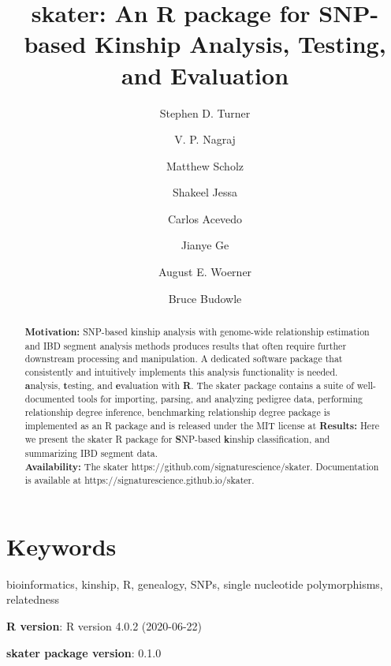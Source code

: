 \documentclass[9pt,a4paper,]{extarticle}
\begin{document}
\pagestyle{front}

\title{\textbf{skater}: An R package for SNP-based Kinship Analysis, Testing, and Evaluation}

\author[1]{Stephen D. Turner}
\author[1]{V. P. Nagraj}
\author[1]{Matthew Scholz}
\author[1]{Shakeel Jessa}
\author[1]{Carlos Acevedo}
\author[2]{Jianye Ge}
\author[2]{August E. Woerner}
\author[2]{Bruce Budowle}

\maketitle
\thispagestyle{front}

\begin{abstract}
\textbf{Motivation:} SNP-based kinship analysis with genome-wide relationship estimation and IBD segment analysis methods produces results that often require further downstream processing and manipulation. A dedicated software package that consistently and intuitively implements this analysis functionality is needed.\\
\textbf{a}nalysis, \textbf{t}esting, and \textbf{e}valuation with \textbf{R}. The skater package contains a suite of well-documented tools for importing, parsing, and analyzing pedigree data, performing relationship degree inference, benchmarking relationship degree package is implemented as an R package and is released under the MIT license at \textbf{Results:} Here we present the skater R package for \textbf{S}NP-based \textbf{k}inship classification, and summarizing IBD segment data.\\
\textbf{Availability:} The skater https://github.com/signaturescience/skater. Documentation is available at https://signaturescience.github.io/skater.
\end{abstract}

\section*{Keywords}
bioinformatics, kinship, R, genealogy, SNPs, single nucleotide polymorphisms, relatedness


\clearpage
\pagestyle{main}

\textbf{R version}: R version 4.0.2 (2020-06-22)

\textbf{skater package version}: 0.1.0
\end{document}
